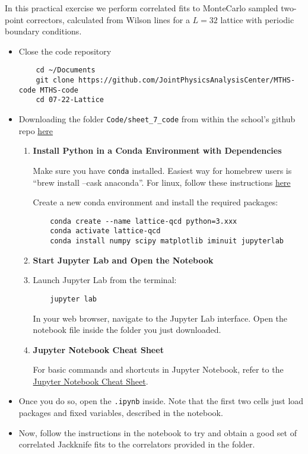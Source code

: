 In this practical exercise we perform correlated fits to
MonteCarlo sampled two-point correctors,
calculated from Wilson lines for a $L=32$ lattice with periodic boundary conditions.

\begin{itemize}
    \item Close the code repository
          \begin{verbatim}
    cd ~/Documents
    git clone https://github.com/JointPhysicsAnalysisCenter/MTHS-code MTHS-code
    cd 07-22-Lattice
    \end{verbatim}

    \item Downloading the folder \texttt{Code/sheet\_7\_code} from within the school's github repo \href{https://github.com/JointPhysicsAnalysisCenter/MTHS-code}{here}
          \begin{enumerate}
              \item \textbf{Install Python in a Conda Environment with Dependencies}

                    Make sure you have \texttt{conda} installed. Easiest way for homebrew users is ``brew install --cask anaconda''.
                    For linux, follow these instructions \href{https://docs.conda.io/projects/conda/en/latest/user-guide/install/linux.html}{here}

                    Create a new conda environment and install the required packages:
                    \begin{verbatim}
    conda create --name lattice-qcd python=3.xxx
    conda activate lattice-qcd
    conda install numpy scipy matplotlib iminuit jupyterlab
    \end{verbatim}

              \item \textbf{Start Jupyter Lab and Open the Notebook}
              \item
                    Launch Jupyter Lab from the terminal:
                    \begin{verbatim}
    jupyter lab
    \end{verbatim}
                    In your web browser, navigate to the Jupyter Lab interface. Open the notebook file inside the folder you just downloaded.

              \item \textbf{Jupyter Notebook Cheat Sheet}

                    For basic commands and shortcuts in Jupyter Notebook, refer to the \href{https://jupyter-notebook.readthedocs.io/en/stable/notebook.html}{Jupyter Notebook Cheat Sheet}.
          \end{enumerate}
    \item Once you do so, open the \texttt{.ipynb} inside. Note that the first two cells just load packages and fixed variables, described in the notebook.
    \item Now, follow the instructions in the notebook to try and obtain a good set of correlated Jackknife fits to the correlators provided in the folder.
\end{itemize}
